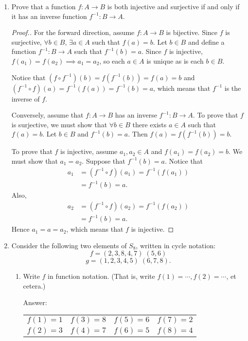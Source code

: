 \documentclass[11pt,twoside]{article}
\begin{document}
\begin{enumerate}
\item Prove that a function $f: A \rightarrow B$ is both injective and surjective if and only if it has an inverse function $f^{-1}: B \rightarrow A$.

\begin{proof}[\color{red}Proof.]
For the forward direction, assume $f\colon A\to B$ is bijective.  Since $f$ is surjective, $\forall b\in B$, $\exists a\in A$ such that $f(a) = b$.  Let $b\in B$ and define a function $f^{-1}\colon B \to A$ such that $f^{-1}(b) = a$.  Since $f$ is injective, $f(a_1) = f(a_2) \implies a_1 = a_2$, so each $a\in A$ is unique as is each $b\in B$.

Notice that $(f\circ f^{-1})(b) = f(f^{-1}(b)) = f(a) = b$ and $(f^{-1}\circ f)(a) = f^{-1}(f(a)) = f^{-1}(b) = a$, which means that $f^{-1}$ is the inverse of $f$.

Conversely, assume that $f\colon A\to B$ has an inverse $f^{-1}\colon B\to A$.  To prove that $f$ is surjective, we must show that $\forall b\in B$ there exists $a\in A$ such that $f(a) = b$.  Let $b\in B$ and $f^{-1}(b) = a$.  Then $f(a) = f(f^{-1}(b)) = b$.

To prove that $f$ is injective, assume $a_1, a_2 \in A$ and $f(a_1) = f(a_2) = b$.  We must show that $a_1 = a_2$.  Suppose that $f^{-1}(b) = a$.  Notice that
\begin{align*}
a_1 &= (f^{-1}\circ  f)(a_1) = f^{-1}(f(a_1))\\
&= f^{-1}(b) = a.
\end{align*}
Also,
\begin{align*}
a_2 &= (f^{-1}\circ  f)(a_2) = f^{-1}(f(a_2))\\
&= f^{-1}(b) = a.
\end{align*}
Hence $a_1=a=a_2$, which means that $f$ is injective.
\end{proof}

\vspace{0.5cm}

\item Consider the following two elements of $S_8$, written in cycle notation:
\[f = (2,3,8,4,7) \; (5,6) \]
\[ g= (1,2,3,4,5) \; (6,7,8).\]

\begin{enumerate}[label=(\alph*)]
\item Write $f$ in function notation.  (That is, write $f(1) = \cdots, f(2) = \cdots$, et cetera.)

{\color{red}Answer:}

\begin{tabular}{ r r r r }
$f(1) = 1$	& $f(3) = 8$	& $f(5) = 6$	& $f(7) = 2$\\
$f(2) = 3$	& $f(4) = 7$	& $f(6) = 5$	& $f(8) = 4$
\end{tabular}


\end{enumerate}
\end{enumerate}
\end{document}

